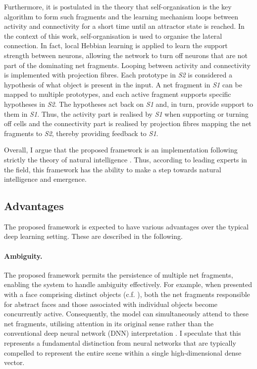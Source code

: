 Furthermore, it is postulated in the theory that self-organisation is the key algorithm to form such fragments and the learning mechanism loops between activity and connectivity for a short time until an attractor state is reached.
In the context of this work, self-organisation is used to organise the lateral connection. In fact, local Hebbian learning is applied to learn the support strength between neurons, allowing the network to turn off neurons that are not part of the dominating net fragments.
Looping between activity and connectivity is implemented with projection fibres. 
Each prototype in \emph{S2} is considered a hypothesis of what object is present in the input. A net fragment in \emph{S1} can be mapped to multiple prototypes, and each active fragment supports specific hypotheses in \emph{S2}. The hypotheses act back on \emph{S1} and, in turn, provide support to them in \emph{S1}. Thus, the activity part is realised by \emph{S1} when supporting or turning off cells and the connectivity part is realised by projection fibres mapping the net fragments to \emph{S2}, thereby providing feedback to \emph{S1}.

Overall, I argue that the proposed framework is an implementation following strictly the theory of natural intelligence . Thus, according to leading experts in the field, this framework has the ability to make a step towards natural intelligence and emergence. 

\subsection{Advantages}
The proposed framework is expected to have various advantages over the typical deep learning setting. These are described in the following.

\paragraph{Ambiguity.} The proposed framework permits the persistence of multiple net fragments, enabling the system to handle ambiguity effectively. For example, when presented with a face comprising distinct objects (c.f. ), both the net fragments responsible for abstract faces and those associated with individual objects become concurrently active. Consequently, the model can simultaneously attend to these net fragments, utilising attention in its original sense rather than the conventional deep neural network (DNN) interpretation . I speculate that this represents a fundamental distinction from neural networks that are typically compelled to represent the entire scene within a single high-dimensional dense vector.


